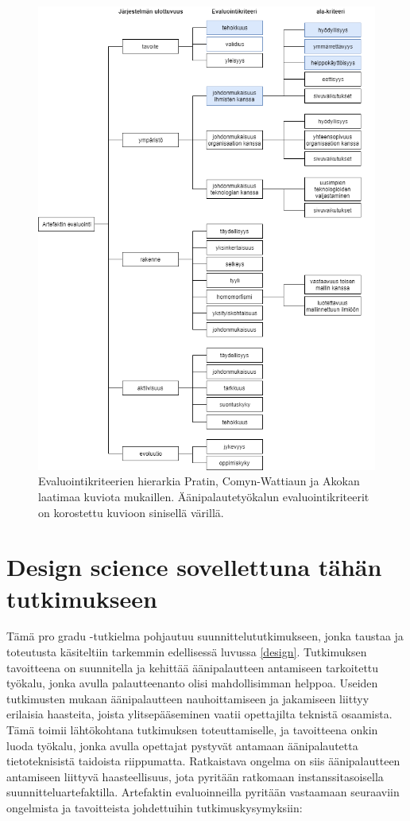\documentclass[utf8]{gradu3}
\begin{document}
\begin{figure}[H]\centering
{}
  \includegraphics[width=\textwidth,height=\textheight,keepaspectratio]{evaluointikriteerit}
  \caption{Evaluointikriteerien hierarkia Pratin, Comyn-Wattiaun ja Akokan \parencite{evaluation} laatimaa kuviota mukaillen. Äänipalautetyökalun evaluointikriteerit on korostettu kuvioon sinisellä värillä.}
  \label{fig:evaluointikriteerit}
\restoregeometry
\end{figure}

\section{Design science sovellettuna tähän tutkimukseen}

Tämä pro gradu -tutkielma pohjautuu suunnittelututkimukseen, jonka taustaa ja toteutusta käsiteltiin tarkemmin edellisessä luvussa \ref{design}. Tutkimuksen tavoitteena on suunnitella ja kehittää äänipalautteen antamiseen tarkoitettu työkalu, jonka avulla palautteenanto olisi mahdollisimman helppoa. Useiden tutkimusten mukaan äänipalautteen nauhoittamiseen ja jakamiseen liittyy erilaisia haasteita, joista ylitsepääseminen vaatii opettajilta teknistä osaamista. Tämä toimii lähtökohtana tutkimuksen toteuttamiselle, ja tavoitteena onkin luoda työkalu, jonka avulla opettajat pystyvät antamaan äänipalautetta tietoteknisistä taidoista riippumatta. Ratkaistava ongelma on siis äänipalautteen antamiseen liittyvä haasteellisuus, jota pyritään ratkomaan instanssitasoisella suunnitteluartefaktilla. Artefaktin evaluoinneilla pyritään vastaamaan seuraaviin ongelmista ja tavoitteista johdettuihin tutkimuskysymyksiin:
\end{document}
